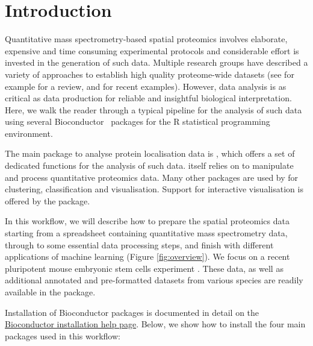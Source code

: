 

\section*{Introduction}

Quantitative mass spectrometry-based spatial proteomics involves
elaborate, expensive and time consuming experimental protocols and
considerable effort is invested in the generation of such data.
Multiple research groups have described a variety of approaches to
establish high quality proteome-wide datasets (see for example
\cite{Gatto:2010} for a review, and
\cite{hyper,Itzhak:2016,Jean_Beltran:2016,Itzhak:2017,Hirst:2018} for
recent examples). However, data analysis is as critical as data
production for reliable and insightful biological
interpretation. Here, we walk the reader through a typical pipeline
for the analysis of such data using several
Bioconductor~\cite{Huber:2015} packages for the R statistical
programming environment.

The main package to analyse protein localisation data is
, which offers a set of dedicated functions for the
analysis of such data.  itself relies on
 to manipulate and process quantitative proteomics
data. Many other packages are used by  for clustering,
classification and visualisation. Support for interactive
visualisation is offered by the  package.

In this workflow, we will describe how to prepare the spatial
proteomics data starting from a spreadsheet containing quantitative
mass spectrometry data, through to some essential data processing
steps, and finish with different applications of machine learning
(Figure \ref{fig:overview}). We focus on a recent pluripotent mouse
embryonic stem cells experiment \cite{hyper}. These data, as well as
additional annotated and pre-formatted datasets from various species
are readily available in the  package.

Installation of Bioconductor packages is documented in detail on the
\href{http://bioconductor.org/install/#install-bioconductor-packages}{Bioconductor
  installation help page}. Below, we show how to install the four main
packages used in this workflow:

\begin{knitrout}
\color{fgcolor}\begin{kframe}
\begin{alltt}
\hlstd{(}\hlstd{)}
\hlstd{(}\hlstd{(}\hlstd{,} \hlstd{,} \hlstd{,} \hlstd{))}
\end{alltt}
\end{kframe}
\end{knitrout}


